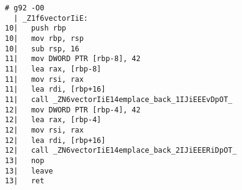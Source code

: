 \begin{lstlisting}[language={},numbers=none,title=\href{https://godbolt.org/z/dYMsza}{\texttt{godbolt.org/z/dYMsza}}]
# g92 -O0
  | _Z1f6vectorIiE:
10|   push rbp
10|   mov rbp, rsp
10|   sub rsp, 16
11|   mov DWORD PTR [rbp-8], 42
11|   lea rax, [rbp-8]
11|   mov rsi, rax
11|   lea rdi, [rbp+16]
11|   call _ZN6vectorIiE14emplace_back_1IJiEEEvDpOT_
12|   mov DWORD PTR [rbp-4], 42
12|   lea rax, [rbp-4]
12|   mov rsi, rax
12|   lea rdi, [rbp+16]
12|   call _ZN6vectorIiE14emplace_back_2IJiEEERiDpOT_
13|   nop
13|   leave
13|   ret
\end{lstlisting}
